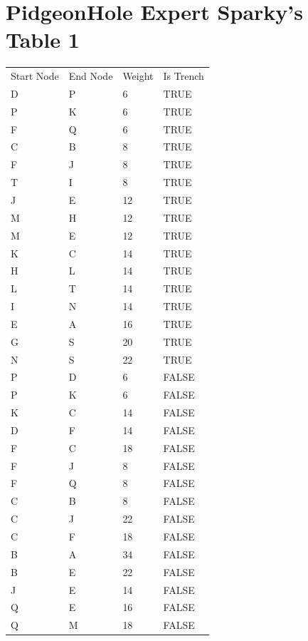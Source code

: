 \documentclass[11pt]{book}
\renewcommand{\=}[1]{\stackrel{#1}{=}} %
\theoremstyle{definition}
\theoremstyle{remark}
\begin{document}
\section{PidgeonHole Expert Sparky's Table 1}
\begin{table}[]
\begin{tabular}{llll}
Start Node & End Node & Weight & Is Trench \\
\rowcolor[HTML]{FFCCC9} 
D & P & 6 & TRUE \\
\rowcolor[HTML]{FFCCC9} 
P & K & 6 & TRUE \\
F & Q & 6 & TRUE \\
\rowcolor[HTML]{FFCCC9} 
C & B & 8 & TRUE \\
\rowcolor[HTML]{FFCCC9} 
F & J & 8 & TRUE \\
T & I & 8 & TRUE \\
J & E & 12 & TRUE \\
M & H & 12 & TRUE \\
\rowcolor[HTML]{FFCCC9} 
M & E & 12 & TRUE \\
\rowcolor[HTML]{FFCCC9} 
K & C & 14 & TRUE \\
H & L & 14 & TRUE \\
L & T & 14 & TRUE \\
\rowcolor[HTML]{FFCCC9} 
I & N & 14 & TRUE \\
E & A & 16 & TRUE \\
G & S & 20 & TRUE \\
N & S & 22 & TRUE \\
\rowcolor[HTML]{9AFF99} 
P & D & 6 & FALSE \\
\rowcolor[HTML]{9AFF99} 
P & K & 6 & FALSE \\
\rowcolor[HTML]{9AFF99} 
K & C & 14 & FALSE \\
D & F & 14 & FALSE \\
F & C & 18 & FALSE \\
\rowcolor[HTML]{67FD9A} 
F & J & 8 & FALSE \\
F & Q & 8 & FALSE \\
\rowcolor[HTML]{9AFF99} 
C & B & 8 & FALSE \\
C & J & 22 & FALSE \\
C & F & 18 & FALSE \\
B & A & 34 & FALSE \\
B & E & 22 & FALSE \\
J & E & 14 & FALSE \\
Q & E & 16 & FALSE \\
Q & M & 18 & FALSE \\

\end{tabular}
\end{table}
\end{document}
